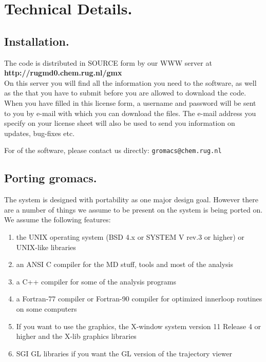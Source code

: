 \chapter{Technical Details.}
\label{ch:install}
\section{Installation.}
The {\gromacs} code is distributed in SOURCE form by our WWW server at\\
{\bf http://rugmd0.chem.rug.nl/{\TILDE}gmx}\\
On this server you will find all the information you need to 
the software, as well as the  that you have to submit
before you are allowed to download the code. When you have filled in this
license form, a username and password will be sent to you by e-mail
with which you can download the files. The e-mail address you specify
on your license sheet will also be used to send you information on
updates, bug-fixes etc.

For  of the software, please contact us directly:
{\tt gromacs@chem.rug.nl}

\section{Porting gromacs.}
The {\gromacs} system is designed with portability as one major design
goal. However there are a number of things we assume to be present on
the system {\gromacs} is being ported on. We assume the following
features:

\begin{enumerate}
\item 	the UNIX operating system (BSD 4.x or SYSTEM V rev.3 or higher) 
	or UNIX-like libraries
\item 	an ANSI C compiler for the MD stuff, tools and most of the analysis
\item	a C++ compiler for some of the analysis programs
\item	a Fortran-77 compiler or Fortran-90 compiler
	for optimized innerloop routines on some computers
\item 	If you want to use the graphics, the X-window system version 
	11 Release 4 or higher and the X-lib graphics libraries
\item	SGI GL libraries if you want the GL version of the trajectory
	viewer
\end{enumerate}

